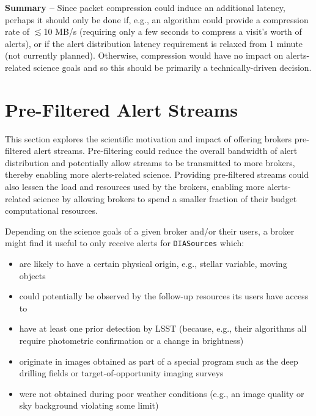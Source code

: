 \documentclass[DM,lsstdraft,authoryear,toc]{lsstdoc}
\begin{document}
{\bf Summary --} Since packet compression could induce an additional latency, perhaps it should only be done if, e.g., an algorithm could provide a compression rate of $\lesssim$10 MB/s (requiring only a few seconds to compress a visit's worth of alerts), or if the alert distribution latency requirement is relaxed from 1 minute (not currently planned).
Otherwise, compression would have no impact on alerts-related science goals and so this should be primarily a technically-driven decision.



\clearpage
\section{Pre-Filtered Alert Streams} \label{sec:prefilter}

This section explores the scientific motivation and impact of offering brokers pre-filtered alert streams. 
Pre-filtering could reduce the overall bandwidth of alert distribution and potentially allow streams to be transmitted to more brokers, thereby enabling more alerts-related science.
Providing pre-filtered streams could also lessen the load and resources used by the brokers, enabling more alerts-related science by allowing brokers to spend a smaller fraction of their budget computational resources.

Depending on the science goals of a given broker and/or their users, a broker might find it useful to only receive alerts for {\tt DIASources} which:
\begin{itemize}
\item are likely to have a certain physical origin, e.g., stellar variable, moving objects
\item could potentially be observed by the follow-up resources its users have access to
\item have at least one prior detection by LSST (because, e.g., their algorithms all require photometric confirmation or a change in brightness)
\item originate in images obtained as part of a special program such as the deep drilling fields or target-of-opportunity imaging surveys
\item were not obtained during poor weather conditions (e.g., an image quality or sky background violating some limit)
\end{itemize}
\end{document}
